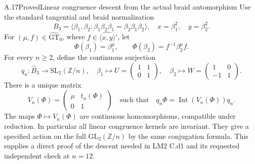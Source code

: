 \begin{statement}{A.17}{Proved}{Linear congruence descent from the actual braid automorphism}
Use the standard tangential and braid normalization
\[
 B_3=\langle\beta_1,\beta_2:
              \beta_1\beta_2\beta_1=\beta_2\beta_1\beta_2\rangle,
 \quad x=\beta_1^2,\quad y=\beta_2^2.
\]
For $(\mu,f)\in\widehat{\mathrm{GT}}_0$, where
$f\in\widehat{\langle x,y\rangle}'$, let
\[
 \Phi(\beta_1)=\beta_1^\mu,\qquad
 \Phi(\beta_2)=f^{-1}\beta_2^\mu f.                \tag{A.17.1}
\]
For every $n\geq2$, define the continuous surjection
\[
 q_n:\widehat B_3\longrightarrow\mathrm{SL}_2(\mathbb Z/n),
 \quad\beta_1\mapsto U=\begin{pmatrix}1&1\\0&1\end{pmatrix},
 \quad\beta_2\mapsto W=\begin{pmatrix}1&0\\-1&1\end{pmatrix}.
\]
There is a unique matrix
\[
 V_n(\Phi)=\begin{pmatrix}\mu&t_n(\Phi)\\0&1\end{pmatrix}
 \quad\text{such that}\quad
 q_n\Phi=\operatorname{Int}(V_n(\Phi))q_n.          \tag{A.17.2}
\]
The maps $\Phi\mapsto V_n(\Phi)$ are continuous homomorphisms,
compatible under reduction. In particular all linear congruence
kernels are invariant. They give a specified action on the full
$\mathrm{GL}_2(\mathbb Z/n)$ by the same conjugation formula.
This supplies a direct proof of the descent needed in LM2 C.d1 and
its requested independent check at $n=12$.
\end{statement}

